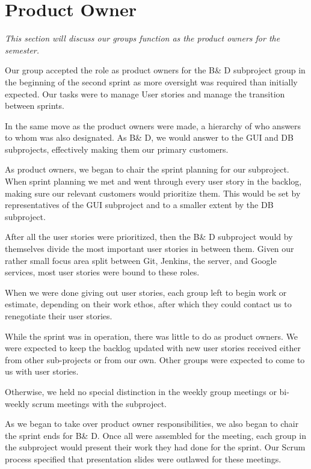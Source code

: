 \section{Product Owner} \label{Roles_SecProductOwner}
\textit{This section will discuss our groups function as the product owners for the semester.}

Our group accepted the role as product owners for the B\& D subproject group in the beginning of the second sprint as more oversight was required than initially expected. Our tasks were to manage User stories and manage the transition between sprints.

In the same move as the product owners were made, a hierarchy of who answers to whom was also designated. As B\& D, we would answer to the GUI and DB subprojects, effectively making them our primary customers. 

As product owners, we began to chair the sprint planning for our subproject. When sprint planning we met and went through every user story in the backlog, making sure our relevant customers would prioritize them. This would be set by representatives of the GUI subproject and to a smaller extent by the DB subproject.

After all the user stories were prioritized, then the B\& D subproject would by themselves divide the most important user stories in between them. Given our rather small focus area split between Git, Jenkins, the server, and Google services, most user stories were bound to these roles.

When we were done giving out user stories, each group left to begin work or estimate, depending on their work ethos, after which they could contact us to renegotiate their user stories.

While the sprint was in operation, there was little to do as product owners. We were expected to keep the backlog updated with new user stories received either from other sub-projects or from our own. Other groups were expected to come to us with user stories.

Otherwise, we held no special distinction in the weekly group meetings or bi-weekly scrum meetings with the subproject.

As we began to take over product owner responsibilities, we also began to chair the sprint ends for B\& D. Once all were assembled for the meeting, each group in the subproject would present their work they had done for the sprint. Our Scrum process specified that presentation slides were outlawed for these meetings.

